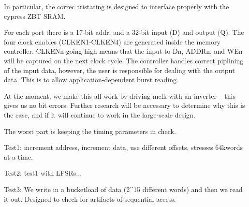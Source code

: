 In particular, the correc tristating is designed to interface properly with the cypress ZBT SRAM. 

For each port there is a 17-bit addr, and a 32-bit input (D) and output (Q). The four clock enables (CLKEN1-CLKEN4) are generated inside the memory controller. CLKENn going high means that the input to Dn, ADDRn, and WEn will be captured on the next clock cycle. The controller handles correct piplining of the input data, however, the user is responsible for dealing with the output data. This is to allow application-dependent burst reading. 

At the moment, we make this all work by driving mclk with an inverter -- this gives us no bit errors. Further research will be necessary to determine why this is the case, and if it will continue to work in the large-scale design.  

The worst part is keeping the timing parameters in check. 

Test1: increment address, increment data, use different offsets, stresses 64kwords at a time. 

Test2: test1 with LFSRs...

Test3: We write in a bucketload of data (2^15 different words) and then we read it out. Designed to check for artifacts of sequential access. 

